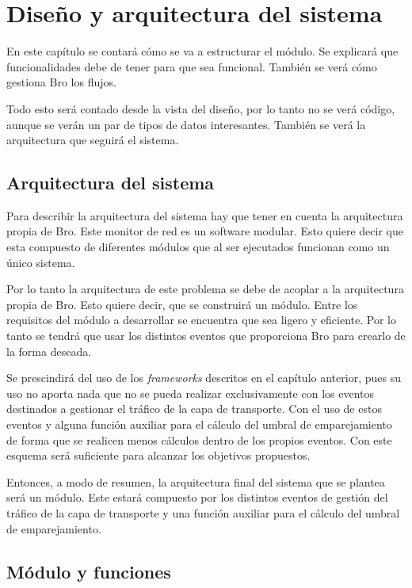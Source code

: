 \chapter{Diseño y arquitectura del sistema}

En este capítulo se contará cómo se va a estructurar el módulo. Se explicará que funcionalidades debe de tener 
para que sea funcional. También se verá cómo gestiona Bro los flujos. 

\intro Todo esto será contado desde la vista del diseño, por lo tanto no se verá código, aunque se verán un par 
de tipos de datos interesantes. También se verá la arquitectura que seguirá el sistema.

\section{Arquitectura del sistema}

Para describir la arquitectura del sistema hay que tener en cuenta la arquitectura propia de Bro. Este monitor de 
red es un software modular. Esto quiere decir que esta compuesto de diferentes módulos que al ser ejecutados 
funcionan como un único sistema.

\intro Por lo tanto la arquitectura de este problema se debe de acoplar a la arquitectura propia de Bro. Esto 
quiere decir, que se construirá un módulo. Entre los requisitos del módulo a desarrollar se encuentra que sea 
ligero y eficiente. Por lo tanto se tendrá que usar los distintos eventos que proporciona Bro para crearlo de 
la forma deseada.

\intro Se prescindirá del uso de los \textit{frameworks} descritos en el capítulo anterior, pues su uso no aporta 
nada que no se pueda realizar exclusivamente con los eventos destinados a gestionar el tráfico de la capa de 
transporte. Con el uso de estos eventos y alguna función auxiliar para el cálculo del umbral de emparejamiento 
de forma que se realicen menos cálculos dentro de los propios eventos. Con este esquema será suficiente 
para alcanzar los objetivos propuestos.

\intro Entonces, a modo de resumen, la arquitectura final del sistema que se plantea será un módulo. Este estará 
compuesto por los distintos eventos de gestión del tráfico de la capa de transporte y una función auxiliar para 
el cálculo del umbral de emparejamiento. 

\section{Módulo y funciones}

